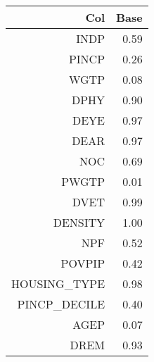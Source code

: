 \begin{table}
    \centering
    \begin{tabular}{rr}
        \toprule
        Col & Base \\
        \midrule
        INDP & 0.59 \\
        PINCP & 0.26 \\
        WGTP & 0.08 \\
        DPHY & 0.90 \\
        DEYE & 0.97 \\
        DEAR & 0.97 \\
        NOC & 0.69 \\
        PWGTP & 0.01 \\
        DVET & 0.99 \\
        DENSITY & 1.00 \\
        NPF & 0.52 \\
        POVPIP & 0.42 \\
        HOUSING_TYPE & 0.98 \\
        PINCP_DECILE & 0.40 \\
        AGEP & 0.07 \\
        DREM & 0.93 \\
        \bottomrule
    \end{tabular}
\end{table}
